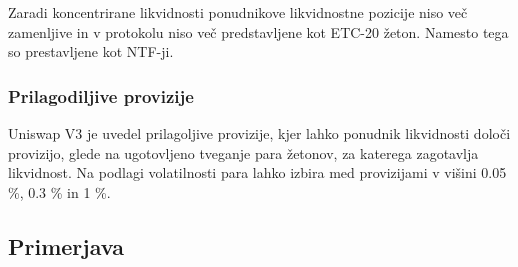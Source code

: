 \documentclass[a4paper,12pt]{article}%
\begin{document}





Zaradi koncentrirane likvidnosti ponudnikove likvidnostne pozicije niso več zamenljive in v protokolu niso več predstavljene kot ETC-20 žeton. Namesto tega so prestavljene kot NTF-ji. 


\subsubsection{Prilagodiljive provizije}
Uniswap V3 je uvedel prilagoljive provizije, kjer lahko ponudnik likvidnosti določi provizijo, glede na ugotovljeno tveganje para žetonov, za katerega zagotavlja likvidnost. Na podlagi volatilnosti para lahko izbira med provizijami v višini 0.05 \%, 0.3 \% in 1 \%. 




\subsection{Primerjava}
\end{document}
